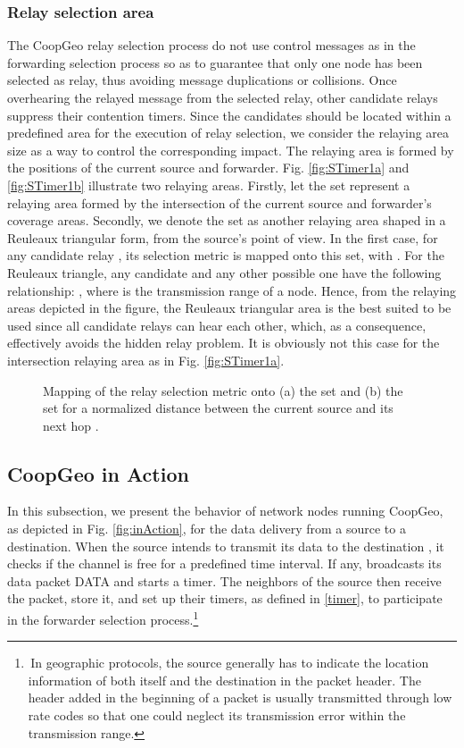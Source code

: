 \documentclass[journal,twoside,final]{IEEEtran}
\begin{document}
\subsubsection{Relay selection area}
The CoopGeo relay selection process do not use control messages as in the forwarding selection process so as to guarantee that only one node has been selected as relay, thus avoiding message duplications or collisions.
Once overhearing the relayed message from the selected relay, other candidate relays suppress their contention timers. Since the candidates should be located within a predefined area for the execution of relay selection, we consider the relaying area size as a way to control the corresponding impact. The relaying area is formed by the positions of the current source and forwarder.
Fig. \ref{fig:STimer1a} and \ref{fig:STimer1b} illustrate two relaying areas.
Firstly, let the set  represent a relaying area formed by the intersection of the current source and forwarder's coverage areas. Secondly, we denote the set  as another relaying area shaped in a Reuleaux triangular form, from the source's point of view.
In the first case, for any candidate relay , its selection metric is mapped onto this set, with . For the Reuleaux triangle, any candidate  and any other possible one  have the following relationship: , where  is the transmission range of a node. Hence, from the relaying areas depicted in the figure, the Reuleaux triangular area is the best suited to be used since all candidate relays can hear each other, which, as a consequence, effectively avoids the hidden relay problem. It is obviously not this case for the intersection relaying area as in Fig. \ref{fig:STimer1a}.


\begin{figure}[bt]
\centerline{
\hfil	
{}}
\caption{Mapping of the relay selection metric onto (a) the set  and (b) the set  for a normalized distance between the current source  and its next hop .}
\end{figure}


\subsection{CoopGeo in Action}
In this subsection, we present the behavior of network nodes running CoopGeo, as depicted in Fig. \ref{fig:inAction}, for the data delivery from a source to a destination.
When the source  intends to transmit its data to the destination , it checks if the channel is free for a predefined time interval. If any,  broadcasts its data packet DATA and starts a  timer. The neighbors of the source then receive the packet, store it, and set up their  timers, as defined in \eqref{timer}, to participate in the forwarder selection process.\footnote{\,In geographic  protocols, the source generally has to indicate the location information of both itself and the destination in the packet header. The header added in the beginning of a packet is usually transmitted through low rate codes so that one could neglect its transmission error within the transmission range.}
\end{document}
